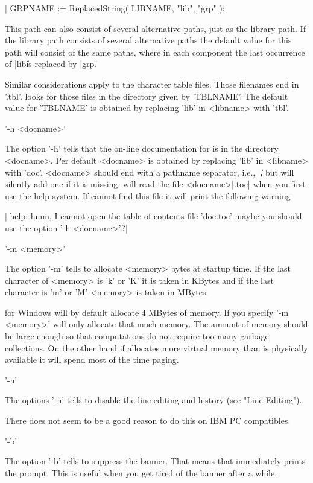 |    GRPNAME := ReplacedString( LIBNAME, "lib", "grp" );|

This path  can also consist of  several  alternative  paths, just as the
library path.  If the library path consists of several alternative paths
the default value for this path will consist of the same paths, where in
each component the last occurrence of |lib\| is replaced by |grp\|.

Similar considerations    apply to   the  character  table  files.  Those
filenames end in '.tbl'.   {\GAP} looks for  those files in the directory
given  by 'TBLNAME'.  The default  value   for 'TBLNAME'  is  obtained by
replacing 'lib' in <libname> with 'tbl'.

'-h <docname>'

The  option '-h' tells {\GAP} that the on-line documentation for {\GAP} is
in  the directory  <docname>.   Per  default  <docname>  is  obtained  by
replacing 'lib' in <libname>  with 'doc'.   <docname> should  end  with a
pathname separator, i.e., |\|, but {\GAP} will silently  add one if it is
missing.  {\GAP} will read the file <docname>|\manual.toc| when you first
use the help system.  If {\GAP} cannot find this file  it will print  the
following warning

|    help: hmm, I cannot open the table of contents file 'doc\manual.toc'
    maybe you should use the option '-h <docname>'?|

'-m <memory>'

The option '-m' tells {\GAP} to  allocate <memory> bytes at startup time.
If the last character of <memory> is 'k' or 'K' it is taken in KBytes and
if the last character is 'm' or 'M' <memory> is taken in MBytes.

{\GAP} for Windows  will by default allocate  4 MBytes of  memory.  If you
specify  '-m <memory>' {\GAP} will  only allocate that  much memory.  The
amount of  memory  should be large  enough so  that computations  do  not
require too  many garbage   collections.  On the   other  hand if  {\GAP}
allocates more virtual memory than is  physically available it will spend
most of the time paging.

'-n'

The  options  '-n' tells {\GAP} to  disable  the line editing and history
(see "Line Editing").

There does not seem to be a good reason to do this on IBM PC compatibles.

'-b'

The option '-b'  tells {\GAP} to  suppress the banner.  That  means  that
{\GAP} immediately prints the prompt.  This is useful  when you get tired
of the banner after a while.

